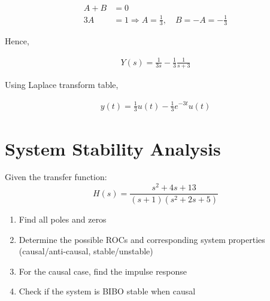 \documentclass{article}
\begin{document}
\begin{enumerate}[label=(\alph*)]
    \begin{align*}
    A + B & = 0\\
    3A & = 1 \Rightarrow A = \frac{1}{3}, \quad B = -A =-\frac{1}{3}
    \end{align*}
    
    Hence, 
    
    \begin{align*}
    Y(s) = \frac{1}{3s} - \frac{1}{3}\frac{1}{s+3}
    \end{align*}
    
    Using Laplace transform table, 
    
    \begin{align*}
    y(t) = \frac{1}{3}u(t) - \frac{1}{3}e^{-3t}u(t)
    \end{align*}
\end{enumerate}

\section{System Stability Analysis}
Given the transfer function:
\[ H(s) = \frac{s^2 + 4s + 13}{(s + 1)(s^2 + 2s + 5)} \]
\begin{enumerate}[label=(\alph*)]
    \item Find all poles and zeros
    \item Determine the possible ROCs and corresponding system properties (causal/anti-causal, stable/unstable)
    \item For the causal case, find the impulse response
    \item Check if the system is BIBO stable when causal
\end{enumerate}
\end{document}
